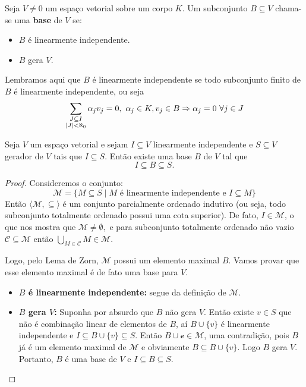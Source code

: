 \documentclass[11pt,twoside,a4paper]{book}
\begin{document}
\begin{definicao}
Seja $V \neq 0$ um espaço vetorial sobre um corpo $K$. Um subconjunto $B\subseteq V$ chama-se uma \textbf{base} de $V$ se:
\begin{itemize}
\item $B$ é linearmente independente.
\item $B$ gera $V$.
\end{itemize}
\end{definicao}
Lembramos aqui que $B$ é linearmente independente se todo subconjunto finito de $B$ é linearmente independente, ou seja
\[
\sum\limits_{\substack{J \subseteq I \\ \abs{J} < \aleph_0}} \alpha_j v_j = 0, \ \alpha_j \in K, v_j \in B \Rightarrow \alpha_j = 0 \ \forall j \in J 
\]
\begin{teorema}
Seja $V$ um espaço vetorial e sejam $I\subseteq V$ linearmente independente e $S\subseteq V$ gerador de $V$ tais que $I\subseteq S$. Então existe uma base $B$ de $V$ tal que \[I\subseteq B\subseteq S.\]
\end{teorema}
\begin{proof}
Consideremos o conjunto:
\[
\mathcal{M}=\{M\subseteq S\mid M\text{ é linearmente independente e }I\subseteq M\}
\]
Então $\langle \mathcal{M},\subseteq \rangle$ é um conjunto parcialmente ordenado indutivo (ou seja, todo subconjunto totalmente ordenado possui uma cota superior). De fato, $I\in\mathcal{M}$, o que nos mostra que $\mathcal{M} \neq \emptyset,$ e para subconjunto totalmente ordenado não vazio $\mathcal{C}\subseteq\mathcal{M}$ então $\bigcup\limits_{M \in \mathcal{C}} M \in\mathcal{M}.$ 

Logo, pelo Lema de Zorn, $\mathcal{M}$ possui um elemento maximal $B$. Vamos provar que esse elemento maximal é de fato uma base para $V.$
\begin{itemize}
    \item \textbf{$B$ é linearmente independente:} segue da definição de $\mathcal{M}.$
    \item \textbf{$B$ gera $V$:} Suponha por absurdo que $B$ não gera $V$. Então existe $v\in S$ que não é combinação linear de elementos de $B$, aí $B\cup\{v\}$ é linearmente independente e $I\subseteq B\cup\{v\}\subseteq S$. Então $B\cup\mathcal{v}\in\mathcal{M}$, uma contradição, pois $B$ já é um elemento maximal de $\mathcal{M}$ e obviamente $B \subseteq B \cup \{ v \}$. Logo $B$ gera $V$. Portanto, $B$ é uma base de $V$ e $I\subseteq B\subseteq S$.
    \end{itemize}
\end{proof}
\end{document}
